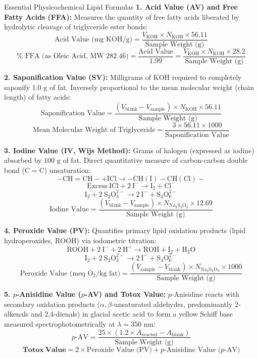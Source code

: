 \documentclass[11pt,a4paper,oneside]{article}
\begin{document}
\begin{formulabox}{Essential Physicochemical Lipid Formulas}
\textbf{1. Acid Value (AV) and Free Fatty Acids (FFA):}
Measures the quantity of free fatty acids liberated by hydrolytic cleavage of triglyceride ester bonds:
$$\text{Acid Value (mg KOH/g)} = \frac{V_{\mathrm{KOH}} \times N_{\mathrm{KOH}} \times 56.11}{\text{Sample Weight (g)}}$$
$$\% \text{ FFA (as Oleic Acid, MW 282.46)} = \frac{\text{Acid Value}}{1.99} = \frac{V_{\mathrm{KOH}} \times N_{\mathrm{KOH}} \times 28.2}{\text{Sample Weight (g)}}$$

\textbf{2. Saponification Value (SV):}
Milligrams of $\mathrm{KOH}$ required to completely saponify $1.0\text{ g}$ of fat. Inversely proportional to the mean molecular weight (chain length) of fatty acids:
$$\text{Saponification Value} = \frac{(V_{\text{blank}} - V_{\text{sample}}) \times N_{\mathrm{KOH}} \times 56.11}{\text{Sample Weight (g)}}$$
$$\text{Mean Molecular Weight of Triglyceride} = \frac{3 \times 56.11 \times 1000}{\text{Saponification Value}}$$

\textbf{3. Iodine Value (IV, Wijs Method):}
Grams of halogen (expressed as iodine) absorbed by $100\text{ g}$ of fat. Direct quantitative measure of carbon-carbon double bond ($\mathrm{C=C}$) unsaturation:
$$\mathrm{-CH=CH- + ICl \longrightarrow -CH(I)-CH(Cl)-}$$
$$\mathrm{Excess\ ICl + 2\ I^- \longrightarrow I_2 + Cl^-}$$
$$\mathrm{I_2 + 2\ S_2O_3^{2-} \longrightarrow 2\ I^- + S_4O_6^{2-}}$$
$$\text{Iodine Value} = \frac{(V_{\text{blank}} - V_{\text{sample}}) \times N_{\mathrm{Na_2S_2O_3}} \times 12.69}{\text{Sample Weight (g)}}$$

\textbf{4. Peroxide Value (PV):}
Quantifies primary lipid oxidation products (lipid hydroperoxides, $\mathrm{ROOH}$) via iodometric titration:
$$\mathrm{ROOH + 2\ I^- + 2\ H^+ \longrightarrow ROH + I_2 + H_2O}$$
$$\mathrm{I_2 + 2\ S_2O_3^{2-} \longrightarrow 2\ I^- + S_4O_6^{2-}}$$
$$\text{Peroxide Value (meq }\mathrm{O_2}\text{/kg fat)} = \frac{(V_{\text{sample}} - V_{\text{blank}}) \times N_{\mathrm{Na_2S_2O_3}} \times 1000}{\text{Sample Weight (g)}}$$

\textbf{5. $p$-Anisidine Value ($p$-AV) and Totox Value:}
$p$-Anisidine reacts with secondary oxidation products ($\alpha,\beta$-unsaturated aldehydes, predominantly 2-alkenals and 2,4-dienals) in glacial acetic acid to form a yellow Schiff base measured spectrophotometrically at \textbf{$\lambda = 350\text{ nm}$}:
$$p\text{-AV} = \frac{25 \times (1.2 \times A_{\text{reacted}} - A_{\text{blank}})}{\text{Sample Weight (g)}}$$
$$\mathbf{Totox\ Value} = 2 \times \text{Peroxide Value (PV)} + p\text{-Anisidine Value (}p\text{-AV)}$$
\end{formulabox}
\end{document}
